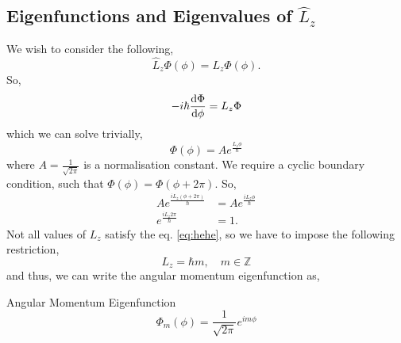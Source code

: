 \documentclass{book}
\begin{document}
\subsection{Eigenfunctions and Eigenvalues of $\hat{L}_z$}
We wish to consider the following,
\begin{equation}
	\hat{L}_z \Phi(\phi) = L_z\Phi(\phi).
\end{equation}
So,
\begin{equation}
	-i\hbar\dv{\Phi}{\phi} = L_z \Phi\label{eq:24}
\end{equation}
which we can solve trivially,
\begin{equation}
	\Phi(\phi) = Ae^{\frac{L_z\phi}{\hbar}} \label{eq:khf}
\end{equation}
where $A = \frac{1}{\sqrt{2\pi}}$ is a normalisation constant. We require a cyclic boundary condition, such that $\Phi(\phi) = \Phi(\phi + 2\pi)$. So,
\begin{equation}
	\begin{split}
	Ae^{\frac{iL_z(\phi + 2\pi)}{\hbar}} & = A e^{\frac{iL_z\phi}{\hbar}} \\
	e^{\frac{iL_z2\pi}{\hbar}} & = 1.
\end{split} \label{eq:hehe}
\end{equation}
Not all values of $L_z$ satisfy the eq. \eqref{eq:hehe}, so we have to impose the following restriction,
\begin{equation}
	L_z = \hbar m, \hspace{1em} m \in \mathbb{Z}
\end{equation}
and thus, we can write the angular momentum eigenfunction as,
\begin{Definitions}{Angular Momentum Eigenfunction}{}
	\begin{equation}
		\Phi_m(\phi) = \frac{1}{\sqrt{2\pi}} e^{im\phi}
	\end{equation}
\end{Definitions}
\end{document}
